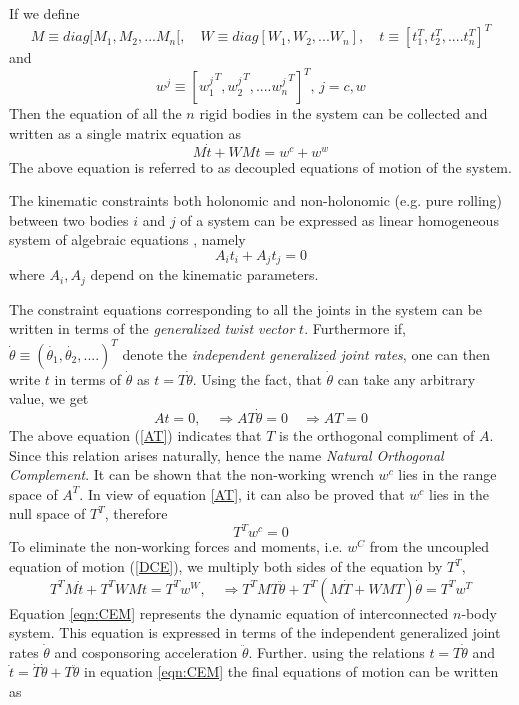 If we define \[M \equiv diag[M_1,M_2,...M_n[, \quad W \equiv diag[W_1,W_2,...W_n], \quad t \equiv [t_1^T,t_2^T, ....t_n^T]^T\] and 
\[ w^j \equiv [{w_1^j}^T,{w_2^j}^T, ....{w_n^j}^T]^T, \,j=c,w \]
Then the equation of all the $n$ rigid bodies in the system can be collected and written as a single matrix equation as 
\begin{equation}
\label{DCE}
M\dot{t}+WMt=w^c+w^w
\end{equation}
 The above equation is referred to as  decoupled equations of motion of the system.



The kinematic constraints both holonomic and non-holonomic (e.g. pure rolling) between two bodies $i$ and $j$ of a system can be expressed as linear homogeneous system of algebraic equations \cite{angeles2013fundamentals}, namely 
\begin{equation}
A_it_i+A_jt_j=0
\end{equation}
where $A_i,A_j$ depend on the kinematic parameters.

The constraint equations corresponding to all the joints in the system can be written in terms of the \textit{generalized twist vector} $t$. Furthermore if, $ \dot{\theta} \equiv(\dot{\theta_1},\dot{\theta_2},....)^T$ denote the \textit{independent generalized joint rates}, one can then write $t$ in terms of $\dot{\theta}$ as $t=T\dot{\theta}$. 
Using the fact, that $\dot{\theta}$ can take any arbitrary value, we get
\begin{equation}
\label{AT}
At=0 , \quad \Rightarrow  AT\dot{\theta}=0\quad \Rightarrow AT=0
\end{equation}
The above equation (\ref{AT}) indicates that $T$ is the orthogonal compliment of $A$.
 Since this relation arises naturally, hence the name \textit{Natural Orthogonal Complement}.
  It can be shown \cite{angeles2013fundamentals} that the non-working wrench $w^c$ lies in the range space of $A^T$.
   In view of equation \ref{AT}, it can also be proved that $w^c$ lies in the null space of $T^T$, therefore
\begin{equation}
T^Tw^c=0
\end{equation}
To eliminate the non-working forces and moments, i.e. $w^C$ from the uncoupled equation of motion (\ref{DCE}), we multiply both sides of the equation  by $T^T$,
\begin{equation}
 T^TM\dot{t}+T^TWMt=T^Tw^W, \quad
 \Rightarrow T^TMT\ddot{\theta}+T^T(M\dot{T}+WMT)\dot{\theta}=T^Tw^T
 \label{eqn:CEM}
\end{equation}
Equation \ref{eqn:CEM} represents the dynamic equation of  interconnected $n$-body system.
 This equation is expressed in terms of the independent generalized joint rates $\dot{\theta}$ and cosponsoring  acceleration $\ddot{\theta}$. Further. using the relations $t=T\dot{\theta}$ and $\dot{t}=\dot{T}\dot{\theta}+T\ddot{\theta}$  in equation \ref{eqn:CEM}  the final equations of motion can be written as

